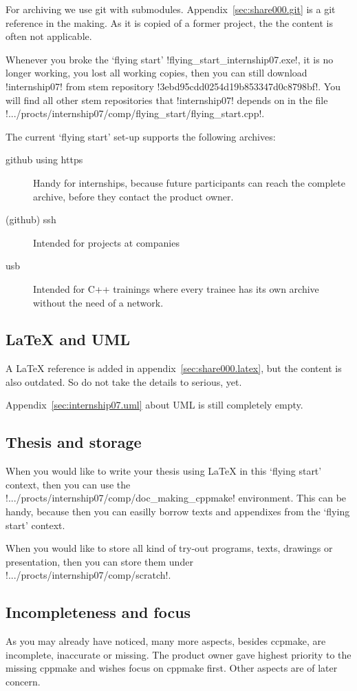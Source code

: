 For archiving we use git with submodules. Appendix~\ref{sec:share000.git} is a git
reference in the making. As it is copied of a former project, the the content is
often not applicable.

Whenever you broke the `flying start' !flying_start_internship07.exe!, it is no
longer working, you lost all working copies, then you can still download !internship07!
from stem repository !3ebd95cdd0254d19b853347d0c8798bf!. You will find all other
stem repositories that !internship07! depends on in the file
!.../procts/internship07/comp/flying_start/flying_start.cpp!.

The current `flying start' set-up supports the following archives:
\begin{description}
\item[github using https] Handy for internships, because future participants can reach
    the complete archive, before they contact the product owner.
\item[(github) ssh] Intended for projects at companies
\item[usb] Intended for C++ trainings where every trainee has its own archive without
    the need of a network.
\end{description}

\subsection{LaTeX and UML}

A LaTeX reference is added in appendix~\ref{sec:share000.latex}, but the content is 
also outdated. So do not take the details to serious, yet.

Appendix~\ref{sec:internship07.uml} about UML is still completely empty.

\subsection{Thesis and storage}

When you would like to write your thesis using LaTeX in this `flying start'
context, then you can use the !.../procts/internship07/comp/doc_making_cppmake!
environment. This can be handy, because then you can easilly borrow texts and
appendixes from the `flying start' context.

When you would like to store all kind of try-out programs, texts, drawings or
presentation, then you can store them under
!.../procts/internship07/comp/scratch!.

\subsection{Incompleteness and focus}

As you may already have noticed, many more aspects, besides ccpmake, are 
incomplete, inaccurate or missing. The product owner gave highest priority
to the missing cppmake and wishes focus on cppmake first. Other aspects are
of later concern.